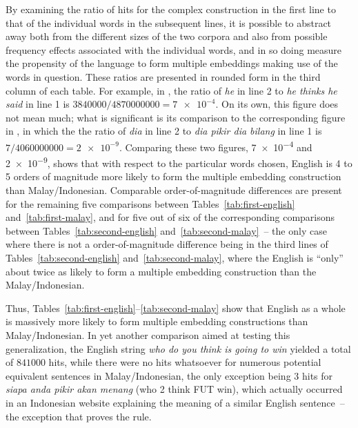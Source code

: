 \documentclass[output=paper,colorlinks,citecolor=brown
]{langscibook}
\begin{document}
By examining the ratio of hits for the complex construction in the first line to that of the individual words in the subsequent lines, it is possible to abstract away both from the different sizes of the two corpora and also from possible frequency effects associated with the individual words, and in so doing measure the propensity of the language to form multiple embeddings making use of the words in question.  These ratios are presented in rounded form in the third column of each table.  For example, in , the ratio of \textit{he} in line 2 to \textit{he thinks he said} in line 1 is $\num{3840000} / \num{4870000000} = \num{7e-4}$.  On its own, this figure does not mean much; what is significant is its comparison to the corresponding figure in , in which the the ratio of \textit{dia} in line 2 to \textit{dia pikir dia bilang} in line 1 is $7 / \num{4060000000} = \num{2e-9}$.  Comparing these two figures, \num{7e-4} and \num{2e-9}, shows that with respect to the particular words chosen, English is 4 to 5 orders of magnitude more likely to form the multiple embedding construction than Malay\slash Indonesian.  Comparable order-of-magnitude differences are present for the remaining five comparisons between Tables~\ref{tab:first-english} and~\ref{tab:first-malay}, and for five out of six of the corresponding comparisons between Tables~\ref{tab:second-english} and~\ref{tab:second-malay}~– the only case where there is not a order-of-magnitude difference being in the third lines of Tables~\ref{tab:second-english} and~\ref{tab:second-malay}, where the English is ``only'' about twice as likely to form a multiple embedding construction than the Malay\slash Indonesian.

Thus, Tables~\ref{tab:first-english}--\ref{tab:second-malay} show that English as a whole is massively more likely to form multiple embedding constructions than Malay\slash Indonesian.  In yet another comparison aimed at testing this generalization, the English string \textit{who do you think is going to win} yielded a total of $\num{841000}$ hits, while there were no hits whatsoever for numerous potential equivalent sentences in Malay\slash Indonesian, the only exception being 3 hits for \textit{siapa anda pikir akan menang} (who 2 think FUT win), which actually occurred in an Indonesian website explaining the meaning of a similar English sentence~– the exception that proves the rule.
\end{document}
